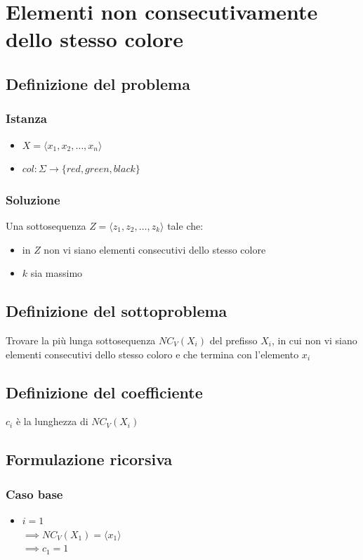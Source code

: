 \newpage
\section{Elementi non consecutivamente dello stesso colore}

\subsection{Definizione del problema}
\subsubsection{Istanza}
\begin{itemize}
    \item $X = \langle x_1, x_2, \dots, x_n \rangle$
    \item $col: \Sigma \to \{red, green, black\}$
\end{itemize}

\subsubsection{Soluzione}
Una sottosequenza $Z = \langle z_1, z_2, \dots, z_k \rangle$ tale che:
\begin{itemize}
    \item in $Z$ non vi siano elementi consecutivi dello stesso colore
    \item $k$ sia massimo
\end{itemize}

\subsection{Definizione del sottoproblema}
Trovare la più lunga sottosequenza $NC_V(X_i)$ del prefisso $X_i$, in cui non vi siano elementi consecutivi dello stesso coloro e che termina con l'elemento $x_i$

\subsection{Definizione del coefficiente}
$c_i$ è la lunghezza di $NC_V(X_i)$


\subsection{Formulazione ricorsiva}

\subsubsection{Caso base}
\begin{itemize}
    \item $i = 1$ \\
    $\implies NC_V(X_1) = \langle x_1 \rangle$ \\
    $\implies c_1 = 1$
\end{itemize}


